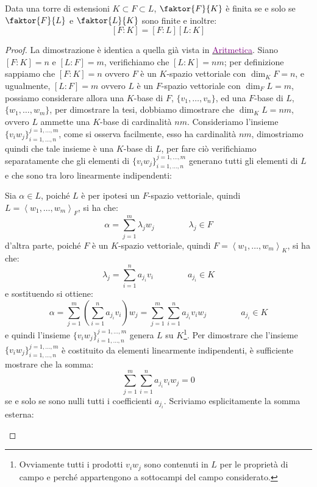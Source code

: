 \documentclass[11pt]{scrartcl}
\begin{document}
\begin{proposition}
    \label{torri}
    Data una torre di estensioni $K \subset F \subset L$, $\faktor{F}{K}$ è finita se e solo se $\faktor{F}{L}$ e $\faktor{L}{K}$ sono finite e inoltre:
    \[ [F:K] = [F:L][L:K]
        \]
\end{proposition}

\begin{proof}
    La dimostrazione è identica a quella già vista in \href{https://github.com/diego-unipi/Appunti-Aritmetica}{\textcolor{purple}{Aritmetica}}. Siano $[F:K] = n$ e $[L:F] = m$, verifichiamo che $[L:K]=nm$;
    per definizione sappiamo che $[F:K] = n$ ovvero $F$ è un $K$-spazio vettoriale con $\dim_KF = n$, e ugualmente, $[L:F] = m$ ovvero $L$ è un $F$-spazio vettoriale con $\dim_FL = m$, possiamo considerare allora una $K$-base di $F$, $\{v_1,\ldots,v_n\}$, ed una $F$-base di $L$, $\{w_1,\ldots,w_m\}$, per dimostrare la tesi, dobbiamo dimostrare che $\dim_KL = nm$, ovvero $L$ ammette una $K$-base di cardinalità $nm$. Consideriamo l'insieme $\{v_iw_j\}_{i=1,\ldots,n}^{j=1,\ldots,m}$, come si osserva facilmente, esso ha cardinalità $nm$, dimostriamo quindi che tale insieme è una $K$-base di $L$, per fare ciò verifichiamo separatamente che gli elementi di $\{v_iw_j\}_{i=1,\ldots,n}^{j=1,\ldots,m}$ generano tutti gli elementi di $L$ e che sono tra loro linearmente indipendenti:
	\begin{itemize}
	\ii Sia $\alpha \in L$, poiché $L$ è per ipotesi un $F$-spazio vettoriale, quindi $L = \left<w_1,\ldots,w_m\right>_F$, si ha che:
		\[ \alpha = \sum_{j=1}^{m} \lambda_jw_j
		\qquad\qquad \lambda_j \in F
		\]
		d'altra parte, poiché $F$ è un $K$-spazio vettoriale, quindi $F = \left<w_1,\ldots,w_m\right>_K$, si ha che:
		\[ \lambda_j = \sum_{i=1}^{n} a_{j_i}v_i
		\qquad\qquad a_{j_i} \in K
		\]
		e sostituendo si ottiene:
		\[ \alpha = \sum_{j=1}^{m} \left( \sum_{i=1}^{n} a_{j_i}v_i\right)w_j = \sum_{j=1}^{m}\sum_{i=1}^{n} a_{j_i}v_iw_j
		\qquad\qquad a_{j_i} \in K
		\]
    e quindi l'insieme $\{v_iw_j\}_{i=1,\ldots,n}^{j=1,\ldots,m}$ genera $L$ su $K$\footnote{Ovviamente tutti i prodotti $v_iw_j$ sono contenuti in $L$ per le proprietà di campo e perché appartengono a sottocampi del campo considerato.}.
	\ii Per dimostrare che l'insieme $\{v_iw_j\}_{i=1,\ldots,n}^{j=1,\ldots,m}$ è costituito da elementi linearmente indipendenti, è sufficiente mostrare che la somma:
		\[ \sum_{j=1}^{m}\sum_{i=1}^{n} a_{j_i}v_iw_j = 0
		\]
    se e solo se sono nulli tutti i coefficienti $a_{j_i}$. Scriviamo esplicitamente la somma esterna:

\end{itemize}
\end{proof}
\end{document}
